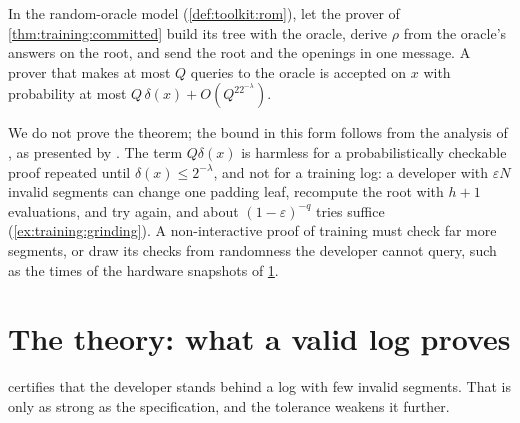 \begin{refsection}
\begin{theorem}\label{thm:training:micali}
In the random-oracle model (\cref{def:toolkit:rom}), let the prover of \cref{thm:training:committed} build its tree with the oracle, derive $\rho$ from the oracle's answers on the root, and send the root and the openings in one message. A prover that makes at most $Q$ queries to the oracle is accepted on $x$ with probability at most $Q\,\delta(x)+O(Q^22^{-\lambda})$.
\end{theorem}

We do not prove the theorem; the bound in this form follows from the analysis of \textcite{BenSassonChiesaSpooner2016}, as presented by \textcite{Thaler2022}. The term $Q\delta(x)$ is harmless for a probabilistically checkable proof repeated until $\delta(x)\le2^{-\lambda}$, and not for a training log: a developer with $\varepsilon N$ invalid segments can change one padding leaf, recompute the root with $h+1$ evaluations, and try again, and about $(1-\varepsilon)^{-q}$ tries suffice (\cref{ex:training:grinding}). A non-interactive proof of training must check far more segments, or draw its checks from randomness the developer cannot query, such as the times of the hardware snapshots of \cref{sec:training:valid}.

\section{The theory: what a valid log proves}\label{sec:training:valid}

 certifies that the developer stands behind a log with few invalid segments. That is only as strong as the specification, and the tolerance weakens it further.


\end{refsection}
